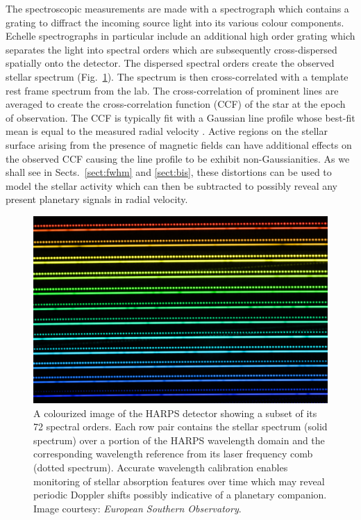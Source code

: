 The spectroscopic measurements are made with a spectrograph which contains a grating to 
diffract the incoming source light into its various colour components. Echelle spectrographs
in particular include an additional high order grating which separates the light into
spectral orders which are subsequently cross-dispersed spatially onto the detector. The dispersed
spectral orders create the observed stellar spectrum (Fig.~\ref{fig:harps}).
The spectrum is then cross-correlated with a  
template rest frame spectrum from the lab. The cross-correlation of prominent lines 
are averaged to create the cross-correlation function (CCF) of the star at the epoch of 
observation. The CCF is typically fit with a Gaussian line profile whose best-fit mean 
is equal to the measured radial velocity \citep{pepe02}. 
Active regions on the stellar surface arising 
from the presence of magnetic fields can have additional effects on the observed CCF 
causing the line profile to be exhibit non-Gaussianities. 
As we shall see in Sects.~\ref{sect:fwhm} and \ref{sect:bis}, these distortions can 
be used to model the stellar activity which can then be subtracted to possibly reveal 
any present planetary signals in radial velocity.

\begin{figure}
  \centering
  \includegraphics[scale=0.5]{figures/20140904_harps-lasercomb.jpg}
  \caption{A colourized image of the HARPS detector showing a subset of its 72 spectral orders.
    Each row pair contains the stellar spectrum (solid spectrum) over a portion of the HARPS wavelength
    domain and the corresponding wavelength reference from its laser frequency comb (dotted spectrum).
    Accurate wavelength calibration enables monitoring of stellar absorption features over time which
    may reveal periodic Doppler shifts possibly indicative of a planetary companion.
    Image courtesy: \emph{European Southern Observatory}.}
  \label{fig:harps}
\end{figure}


